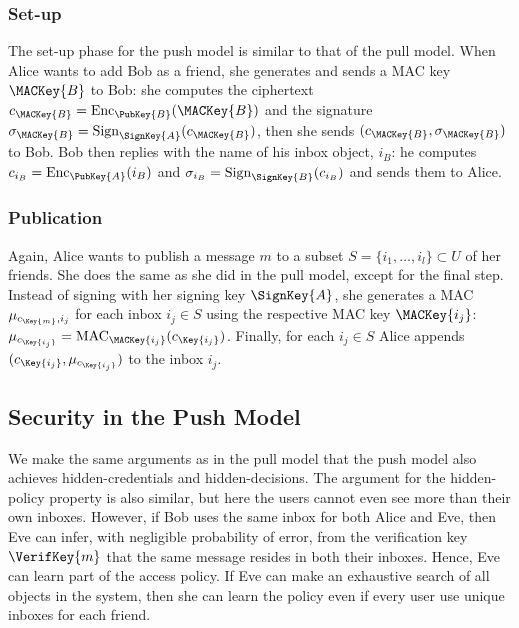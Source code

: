 \subsubsection{Set-up}

The set-up phase for the push model is similar to that of the pull model.
When Alice wants to add Bob as a friend, she generates and sends a \ac{MAC} key 
\(\MACKey{B}\) to Bob:
she computes the ciphertext \(c_{\MACKey{B}} = \Enc_{\PubKey{B}}( \MACKey{B} 
  )\) and the signature \(\sigma_{\MACKey{B}} = \Sign_{\SignKey{A}}( 
  c_{\MACKey{B}} )\), then she sends \((c_{\MACKey{B}}, \sigma_{\MACKey{B}})\) 
to Bob.
Bob then replies with the name of his inbox object, \(i_B\):
he computes \(c_{i_B} = \Enc_{\PubKey{A}}( i_B )\) and \(\sigma_{i_B} 
  = \Sign_{\SignKey{B}}( c_{i_B} )\) and sends them to Alice.

\subsubsection{Publication}

Again, Alice wants to publish a message \(m\) to a subset \(S = \{i_1, \ldots, 
  i_l\}\subset U\) of her friends.
She does the same as she did in the pull model, except for the final step.
Instead of signing with her signing key \(\SignKey{A}\), she generates 
a \ac{MAC} \(\mu_{c_{\Key{m}}, i_j}\) for each inbox \(i_j\in S\) using the 
respective \ac{MAC} key \(\MACKey{i_j}\): \(\mu_{c_{\Key{i_j}}} 
  = \MAC_{\MACKey{i_j}}( c_{\Key{i_j}} )\).
Finally, for each \(i_j\in S\)  Alice appends \((c_{\Key{i_j}}, 
  \mu_{c_{\Key{i_j}}})\) to the inbox \(i_j\).

\subsection{Security in the Push Model}\label{sec:PushModelSec}

We make the same arguments as in the pull model that the push model also 
achieves hidden-credentials and hidden-decisions.
The argument for the hidden-policy property is also similar, but here the users 
cannot even see more than their own inboxes.
However, if Bob uses the same inbox for both Alice and Eve, then Eve can infer, 
with negligible probability of error, from the verification key 
\(\VerifKey{m}\) that the same message resides in both their inboxes.
Hence, Eve can learn part of the access policy.
If Eve can make an exhaustive search of all objects in the system, then she can 
learn the policy even if every user use unique inboxes for each friend.

